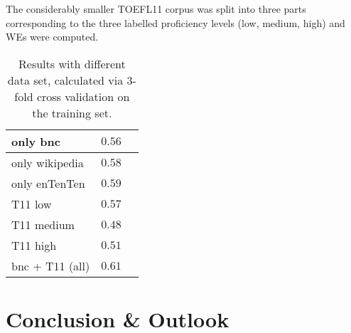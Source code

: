 \documentclass[11pt,a4paper]{article}
\begin{document}
The considerably smaller TOEFL11 corpus was split into three parts corresponding to the three labelled proficiency levels (low, medium, high) and WEs were computed.

\begin{table}[h]
\begin{center}
\begin{tabular}{l|r|r}
\hline
only bnc   		& $0.56$ \\ \hline
only wikipedia 	& $0.58$ \\ \hline
only enTenTen	& $0.59$ \\ \hline
\hline
T11 low 		& $0.57$ \\ \hline
T11 medium		& $0.48$ \\ \hline
T11 high		& $0.51$ \\ \hline
\hline
bnc + T11 (all) & $0.61$ \\ \hline
\end{tabular}
\end{center}
\caption{\label{tab:results}Results with different data set, calculated via 3-fold cross validation on the training set.} 
\end{table}


\section{Conclusion \& Outlook} %
\label{sec:conclusion}




\end{document}
